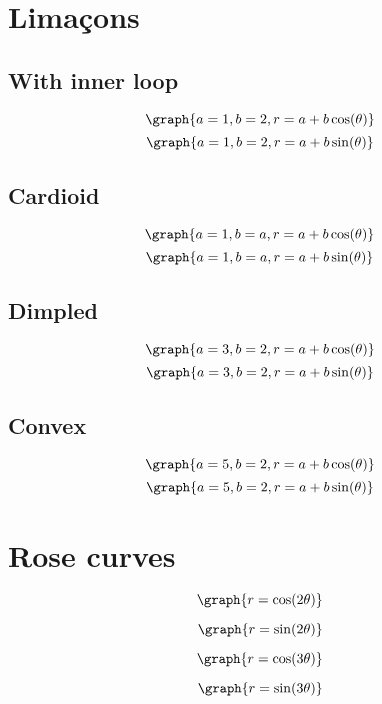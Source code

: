 \documentclass{ximera}
\begin{document}
\section{Lima\c{c}ons}

\subsection{With inner loop}
\[
\graph{a=1,b=2,r=a+b \cos(\theta)}
\]
\[
\graph{a=1,b=2,r=a+b \sin(\theta)}
\]
\subsection{Cardioid}
\[
\graph{a=1,b=a,r=a+b \cos(\theta)}
\]
\[
\graph{a=1,b=a,r=a+b \sin(\theta)}
\]
\subsection{Dimpled}
\[
\graph{a=3,b=2,r=a+b \cos(\theta)}
\]
\[
\graph{a=3,b=2,r=a+b \sin(\theta)}
\]

\subsection{Convex}
\[
\graph{a=5,b=2,r=a+b \cos(\theta)}
\]
\[
\graph{a=5,b=2,r=a+b \sin(\theta)}
\]

\section{Rose curves}

\[
\graph{r=\cos(2\theta)}
\]

\[
\graph{r=\sin(2\theta)}
\]

\[
\graph{r=\cos(3\theta)}
\]

\[
\graph{r=\sin(3\theta)}
\]
\end{document}
